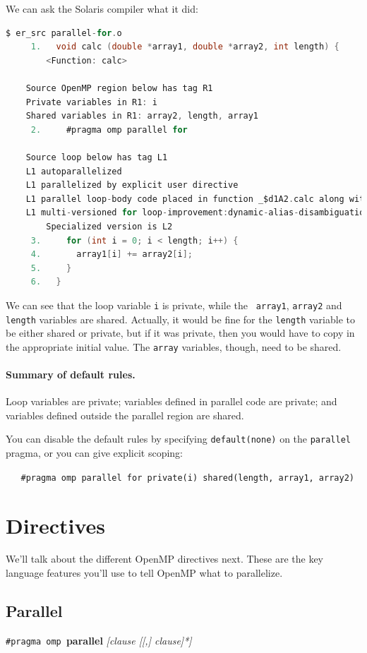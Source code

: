\documentclass[a4paper]{report}
\begin{document}
We can ask the Solaris compiler what it did:
{ 
\begin{lstlisting}[language=C,morekeywords={foreach,pragma,omp,parallel,single,nowait,task,untied,barrier,taskyield}]
$ er_src parallel-for.o
     1.   void calc (double *array1, double *array2, int length) {
        <Function: calc>
    
    Source OpenMP region below has tag R1
    Private variables in R1: i
    Shared variables in R1: array2, length, array1
     2.     #pragma omp parallel for
    
    Source loop below has tag L1
    L1 autoparallelized
    L1 parallelized by explicit user directive
    L1 parallel loop-body code placed in function _$d1A2.calc along with 0 inner loops
    L1 multi-versioned for loop-improvement:dynamic-alias-disambiguation. 
        Specialized version is L2
     3.     for (int i = 0; i < length; i++) {
     4.       array1[i] += array2[i];
     5.     }
     6.   }
\end{lstlisting}
}

We can see that the loop variable {\tt i} is private, while the {\tt
  array1}, {\tt array2} and {\tt length} variables are shared.
Actually, it would be fine for the {\tt length} variable to be either
shared or private, but if it was private, then you would have to copy
in the appropriate initial value. The {\tt array} variables, though, 
need to be shared.

\paragraph{Summary of default rules.} Loop variables are private; 
variables defined in parallel code are private; and variables defined
outside the parallel region are shared.

You can disable the default rules by specifying {\tt default(none)}
on the {\tt parallel} pragma, or you can give explicit scoping:

\verb+   #pragma omp parallel for private(i) shared(length, array1, array2)+

\section*{Directives}
We'll talk about the different OpenMP directives next. These are the key
language features you'll use to tell OpenMP what to parallelize.

\subsection*{Parallel}
  \begin{center}
    {\tt \#pragma omp }{\bf parallel} {\it [clause [[,] clause]*]}
  \end{center}
\end{document}
